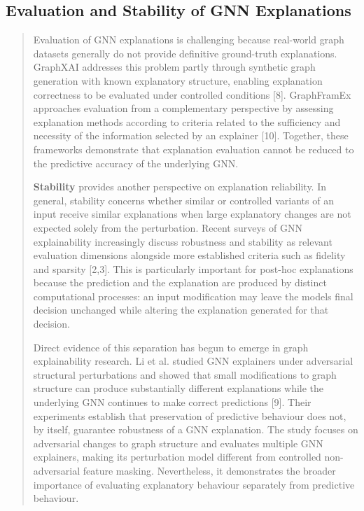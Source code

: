 \documentclass[a4paper]{article}
\begin{document}
\subsection{\texorpdfstring{Evaluation and Stability of GNN Explanations
}{Evaluation and Stability of GNN Explanations }}\label{evaluation-and-stability-of-gnn-explanations}

\begin{quote}
Evaluation of GNN explanations is challenging because real-world graph
datasets generally do not provide definitive ground-truth explanations.
GraphXAI addresses this problem partly through synthetic graph
generation with known explanatory structure, enabling explanation
correctness to be evaluated under controlled conditions {[}8{]}.
GraphFramEx approaches evaluation from a complementary perspective by
assessing explanation methods according to criteria related to the
sufficiency and necessity of the information selected by an explainer
{[}10{]}. Together, these frameworks demonstrate that explanation
evaluation cannot be reduced to the predictive accuracy of the
underlying GNN.

\textbf{Stability} provides another perspective on explanation
reliability. In general, stability concerns whether similar or
controlled variants of an input receive similar explanations when large
explanatory changes are not expected solely from the perturbation.
Recent surveys of GNN explainability increasingly discuss robustness and
stability as relevant evaluation dimensions alongside more established
criteria such as fidelity and sparsity {[}2,3{]}. This is particularly
important for post-hoc explanations because the prediction and the
explanation are produced by distinct computational processes: an input
modification may leave the model\textquotesingle s final decision
unchanged while altering the explanation generated for that decision.

Direct evidence of this separation has begun to emerge in graph
explainability research. Li et al. studied GNN explainers under
adversarial structural perturbations and showed that small modifications
to graph structure can produce substantially different explanations
while the underlying GNN continues to make correct predictions {[}9{]}.
Their experiments establish that preservation of predictive behaviour
does not, by itself, guarantee robustness of a GNN explanation. The
study focuses on adversarial changes to graph structure and evaluates
multiple GNN explainers, making its perturbation model different from
controlled non-adversarial feature masking. Nevertheless, it
demonstrates the broader importance of evaluating explanatory behaviour
separately from predictive behaviour.


\end{quote}
\end{document}
